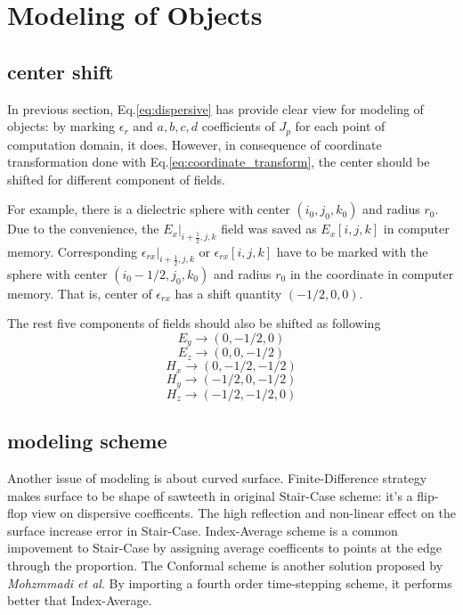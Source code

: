 \section{Modeling of Objects}
\label{sec:modeling}

\subsection{center shift}
In previous section, Eq.\ref{eq:dispersive} has provide clear view for modeling of objects: by marking $\epsilon_r$ and
$a, b, c,d$ coefficients of $J_p$ for each point of computation domain, it does. However, in consequence of coordinate
transformation done with Eq.\ref{eq:coordinate_transform}, the center should be shifted for different component of
fields.

For example, there is a dielectric sphere with center $(i_0,j_0,k_0)$ and radius $r_0$. Due to the convenience, the
$E_x|_{i+\frac{1}{2},j,k}$ field was saved as $E_x[i,j,k]$ in computer memory. Corresponding
$\epsilon_{rx}|_{i+\frac{1}{2},j,k}$ or $\epsilon_{rx}[i,j,k]$ have to be marked with the sphere with center $(i_0-1/2,
j_0, k_0)$ and radius $r_0$ in the coordinate in computer memory. That is, center of $\epsilon_{rx}$ has a shift
quantity $(-1/2,0,0)$.

The rest five components of fields should also be shifted as following
\begin{displaymath}
  E_y \rightarrow (0,-1/2,0)
\end{displaymath}
\begin{displaymath}
  E_z \rightarrow (0,0,-1/2)
\end{displaymath}
\begin{displaymath}
  H_x \rightarrow (0,-1/2,-1/2)
\end{displaymath}
\begin{displaymath}
  H_y \rightarrow (-1/2,0,-1/2)
\end{displaymath}
\begin{displaymath}
  H_z \rightarrow (-1/2,-1/2,0)
\end{displaymath}

\subsection{modeling scheme}
Another issue of modeling is about curved surface. Finite-Difference strategy makes surface to be shape of sawteeth in
original Stair-Case scheme: it's a flip-flop view on dispersive coefficents. The high reflection and non-linear effect
on the surface increase error in Stair-Case. Index-Average scheme is a common impovement to Stair-Case by assigning
average coefficents to points at the edge through the proportion. The Conformal scheme is another solution proposed by
\textit{Mohzmmadi et al}. By importing a fourth order time-stepping scheme, it performs better that Index-Average.

